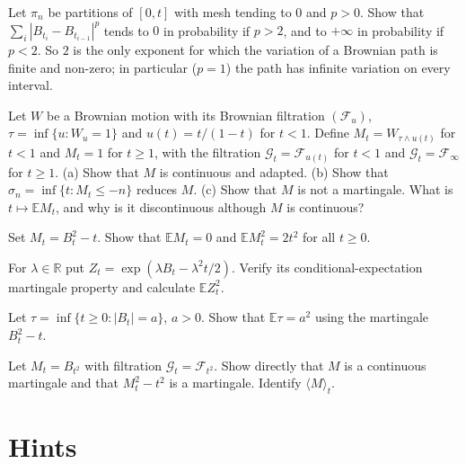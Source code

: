 \begin{exercise}[$\star$]\label{ex:pvariation}
Let $\pi_n$ be partitions of $[0,t]$ with mesh tending to $0$ and $p>0$. Show that $\sum_i|B_{t_i}-B_{t_{i-1}}|^p$ tends to $0$ in probability if $p>2$, and to $+\infty$ in probability if $p<2$. So $2$ is the only exponent for which
the variation of a Brownian path is finite and non-zero; in particular ($p=1$) the path has infinite variation on every interval.
\end{exercise}

\begin{exercise}[$\star\star\star$]\label{ex:strict}
Let $W$ be a Brownian motion with its Brownian filtration $(\mathcal F_u)$, $\tau=\inf\{u:W_u=1\}$ and $u(t)=t/(1-t)$ for $t<1$. Define $M_t=W_{\tau\wedge u(t)}$ for $t<1$ and $M_t=1$ for $t\ge1$, with the
filtration $\mathcal G_t=\mathcal F_{u(t)}$ for $t<1$ and $\mathcal G_t=\mathcal F_\infty$ for $t\ge1$. (a) Show that $M$ is continuous and adapted. (b) Show that $\sigma_n=\inf\{t:M_t\le-n\}$ reduces $M$. (c) Show
that $M$ is not a martingale. What is $t\mapsto\mathbb EM_t$, and why is it discontinuous although $M$ is continuous?
\end{exercise}

\begin{exercise}[$\star$]\label{ex:v12squarevariance}
Set $M_t=B_t^2-t$. Show that $\mathbb EM_t=0$ and $\mathbb EM_t^2=2t^2$ for all $t\ge0$.
\end{exercise}

\begin{exercise}[$\star$]\label{ex:v12expsquare}
For $\lambda\in\mathbb R$ put $Z_t=\exp(\lambda B_t-\lambda^2t/2)$. Verify its conditional-expectation martingale property and calculate $\mathbb EZ_t^2$.
\end{exercise}

\begin{exercise}[$\star\star$]\label{ex:v12exitmean}
Let $\tau=\inf\{t\ge0:|B_t|=a\}$, $a>0$. Show that $\mathbb E\tau=a^2$ using the martingale $B_t^2-t$.
\end{exercise}

\begin{exercise}[$\star\star\star$]\label{ex:v12changeclock}
Let $M_t=B_{t^2}$ with filtration $\mathcal G_t=\mathcal F_{t^2}$. Show directly that $M$ is a continuous martingale and that $M_t^2-t^2$ is a martingale. Identify $\langle M\rangle_t$.
\end{exercise}

\section{Hints}

